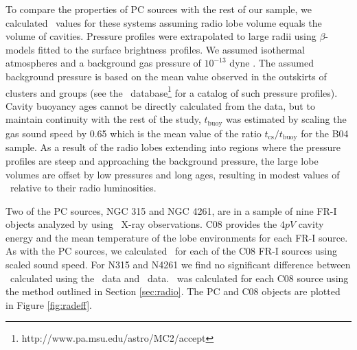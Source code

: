 \documentclass[12pt, preprint]{aastex}
\begin{document}
To compare the properties of PC sources with the rest of our sample,
we calculated \pcav\ values for these systems assuming radio lobe
volume equals the volume of cavities. Pressure profiles were
extrapolated to large radii using $\beta$-models \citep{betamodel}
fitted to the surface brightness profiles. We assumed isothermal
atmospheres and a background gas pressure of $10^{-13}$ dyne
\pcmsq. The assumed background pressure is based on the mean value
observed in the outskirts of clusters and groups (see the
\accept\ database\footnote{http://www.pa.msu.edu/astro/MC2/accept} for
a catalog of such pressure profiles). Cavity buoyancy ages cannot be
directly calculated from the data, but to maintain continuity with the
rest of the study, $t_{\mathrm{buoy}}$ was estimated by scaling the
gas sound speed by 0.65 which is the mean value of the ratio
$t_{\mathrm{cs}}/t_{\mathrm{buoy}}$ for the B04 sample. As a result of
the radio lobes extending into regions where the pressure profiles are
steep and approaching the background pressure, the large lobe volumes
are offset by low pressures and long ages, resulting in modest values
of \pcav\ relative to their radio luminosities.

Two of the PC sources, NGC 315 and NGC 4261, are in a sample of nine
FR-I objects analyzed by \citet[][hereafter C08]{2008MNRAS.386.1709C}
using \xmm\ X-ray observations. C08 provides the $4pV$ cavity energy
and the mean temperature of the lobe environments for each FR-I
source. As with the PC sources, we calculated \pcav\ for each of the
C08 FR-I sources using scaled sound speed. For N315 and N4261 we find
no significant difference between \pcav\ calculated using the
\chandra\ data and \xmm\ data. \phigh\ was calculated for each C08
source using the method outlined in Section \ref{sec:radio}. The PC
and C08 objects are plotted in Figure \ref{fig:radeff}.
\end{document}
